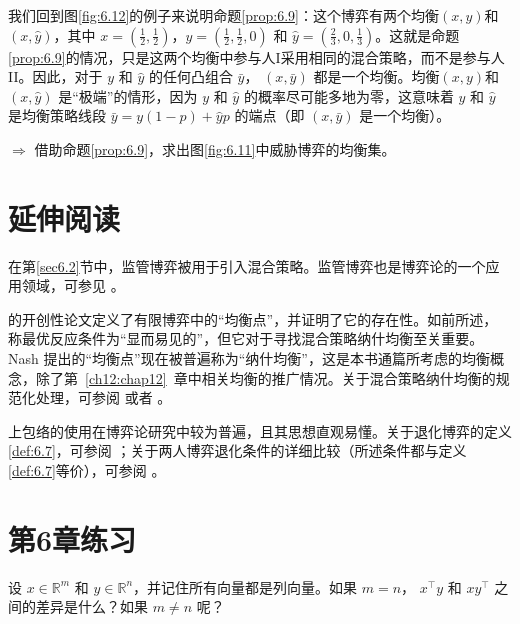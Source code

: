 我们回到图\ref{fig:6.12}的例子来说明命题\ref{prop:6.9}：这个博弈有两个均衡$(x, y)$和 \(\left( {x,\widehat{y}}\right)\)，其中 \(x = \left( {\frac{1}{2},\frac{1}{2}}\right)，y = \left( {\frac{1}{2},\frac{1}{2},0}\right)\) 和 \(\widehat{y} = \left( {\frac{2}{3},0,\frac{1}{3}}\right)\)。这就是命题\ref{prop:6.9}的情况，只是这两个均衡中参与人I采用相同的混合策略，而不是参与人II。因此，对于 \(y\) 和 \(\widehat{y}\) 的任何凸组合 \(\bar{y}\)， \(\left( {x,\bar{y}}\right)\) 都是一个均衡。均衡$(x, y)$和 \(\left( {x,\widehat{y}}\right)\) 是“极端”的情形，因为 \(y\) 和 \(\widehat{y}\) 的概率尽可能多地为零，这意味着 \(y\) 和 \(\widehat{y}\) 是均衡策略线段 \(\bar{y} = y\left( {1 - p}\right)  + \widehat{y}p\) 的端点（即 \(\left( {x,\bar{y}}\right)\) 是一个均衡）。

\(\Rightarrow\) 借助命题\ref{prop:6.9}，求出图\ref{fig:6.11}中威胁博弈的均衡集。

\section{延伸阅读}   \label{sec6.9}

在第\ref{sec6.2}节中，监管博弈被用于引入混合策略。监管博弈也是博弈论的一个应用领域，可参见 \citet{avenhaus1996}。

\citet{nash1951} 的开创性论文定义了有限博弈中的“均衡点”，并证明了它的存在性。如前所述，\citet[p.~287]{nash1951} 称最优反应条件为“显而易见的”，但它对于寻找混合策略纳什均衡至关重要。Nash 提出的“均衡点”现在被普遍称为“纳什均衡”，这是本书通篇所考虑的均衡概念，除了第~\ref{ch12:chap12}~章中相关均衡的推广情况。关于混合策略纳什均衡的规范化处理，可参阅 \citet[Chapter~4]{osborne2004} 或者 \citet*[Chapter~5]{maschler2013}。

上包络的使用在博弈论研究中较为普遍，且其思想直观易懂。关于退化博弈的定义\ref{def:6.7}，可参阅 \citet[p.~52]{vandamme1987}；关于两人博弈退化条件的详细比较（所述条件都与定义\ref{def:6.7}等价），可参阅 \citet{vonstengel2021}。

\section{第6章练习}  \label{sec6.10}

\bigskip
\noindent
\begin{exercise}\label{exer:6.1}
设 \(x \in  {\mathbb{R}}^{m}\) 和 \(y \in  {\mathbb{R}}^{n}\)，并记住所有向量都是列向量。如果 \(m = n\)， \({x}^{\top }y\) 和 \(x{y}^{\top }\) 之间的差异是什么？如果 \(m \neq  n\) 呢？
\end{exercise}


